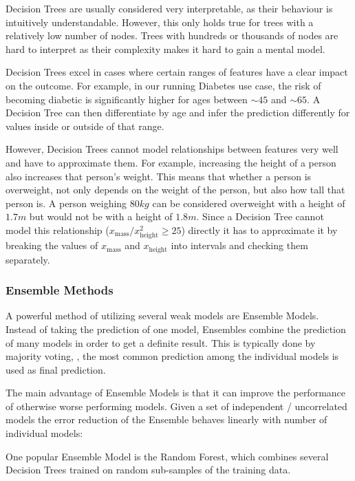 Decision Trees are usually considered very interpretable, as their behaviour is intuitively understandable.
However, this only holds true for trees with a relatively low number of nodes.
Trees with hundreds or thousands of nodes are hard to interpret as their complexity makes it hard to gain a mental model.

Decision Trees excel in cases where certain ranges of features have a clear impact on the outcome.
For example, in our running Diabetes use case, the risk of becoming diabetic is significantly higher for ages between ${\sim}45$ and ${\sim}65$.
A Decision Tree can then differentiate by age and infer the prediction differently for values inside or outside of that range.

However, Decision Trees cannot model relationships between features very well and have to approximate them.
For example, increasing the height of a person also increases that person's weight.
This means that whether a person is overweight, not only depends on the weight of the person, but also how tall that person is.
A person weighing $80\si{kg}$ can be considered overweight with a height of $1.7\si{m}$ but would not be with a height of $1.8\si{m}$.
Since a Decision Tree cannot model this relationship ($x_\text{mass} / x_\text{height}^2 \geq 25$) directly it has to approximate it by breaking the values of $x_\text{mass}$ and $x_\text{height}$ into intervals and checking them separately.

\subsubsection{Ensemble Methods}
A powerful method of utilizing several weak models are Ensemble Models.
Instead of taking the prediction of one model, Ensembles combine the prediction of many models in order to get a definite result.
This is typically done by majority voting, \ie, the most common prediction among the individual models is used as final prediction.

The main advantage of Ensemble Models is that it can improve the performance of otherwise worse performing models.
Given a set of independent / uncorrelated models the error reduction of the Ensemble behaves linearly with number of individual models:

One popular Ensemble Model is the Random Forest, which combines several Decision Trees trained on random sub-samples of the training data.

